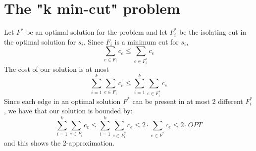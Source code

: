 \section{The "k min-cut" problem}

Let $F^*$ be an optimal solution for the problem and let $F^*_i$ be the isolating cut in the optimal solution for $s_i$. Since $F_i$ is a minimum cut for $s_i$, 
\[
\sum_{e \in F_i} c_e \leq \sum_{e \in F^*_i} c_e
\]
The cost of our solution is at most
\[
\sum_{i=1}^{k} \sum_{e \in F_i} c_e \leq \sum_{i=1}^{k} \sum_{e \in F^*_i} c_e
\]
Since each edge in an optimal solution $F^*$ can be present in at most 2 different $F^*_i$, we have that our solution is bounded by:
\[
\sum_{i=1}^{k} \sum_{e \in F_i} c_e \leq \sum_{i=1}^{k} \sum_{e \in F^*_i} c_e \leq 2 \cdot \sum_{e \in F^*} c_e \leq 2 \cdot OPT
\]
and this shows the 2-approximation.